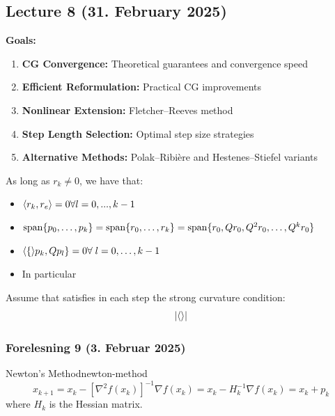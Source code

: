 \subsection{Lecture 8 (31. February 2025)}

\textbf{Goals:}
\begin{enumerate}
    \item \textbf{CG Convergence:} Theoretical guarantees and convergence speed
    \item \textbf{Efficient Reformulation:} Practical CG improvements
    \item \textbf{Nonlinear Extension:} Fletcher--Reeves method
    \item \textbf{Step Length Selection:} Optimal step size strategies
    \item \textbf{Alternative Methods:} Polak--Ribière and Hestenes--Stiefel variants
\end{enumerate}

\begin{theorem}{}{}
    As long as \(r_k \neq 0\), we have that:
    \begin{itemize}
        \item \(\langle r_k, r_e\rangle=0 \forall l = 0,...,k-1 \)
        \item \(\operatorname{span}\{p_0,\ldots, p_k\} = \operatorname{span}\{r_0, \ldots, r_k\} = \operatorname{span}\{r_0, Qr_0, Q^2r_0,\ldots, Q^k r_0\}\)
        \item \(\langle\{\rangle p_k, Qp_l\} = 0 \forall \; l=0,\ldots,k-1\)
        \item In particular 
    \end{itemize}
\end{theorem}

\begin{lemma}{}{}
    Assume that \alpha satisfies in each step the strong curvature condition:
    \[
    \left|\langle\rangle\right|
    \]

\end{lemma}

\subsubsection{Forelesning 9 (3. Februar 2025)}

\begin{definition}{Newton's Method}{newton-method}
    \[
    x_{k+1} = x_k - [\nabla^2 f(x_k)]^{-1} \nabla f(x_k) = x_k - H_k^{-1} \nabla f(x_k) = x_k + p_k
    \]
    where \( H_k \) is the Hessian matrix.
\end{definition}

